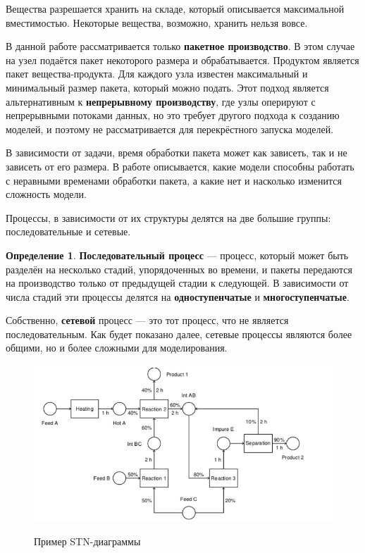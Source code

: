 \documentclass[12pt, twoside]{article}
\theoremstyle{definition}
\newtheorem{definition}[section]{Определение}
\begin{document}
Вещества разрешается хранить на складе, который описывается максимальной вместимостью. Некоторые вещества, возможно, хранить нельзя вовсе.

В данной работе рассматривается только \textbf{пакетное производство}. В этом случае на узел подаётся пакет некоторого размера и обрабатывается. Продуктом является пакет вещества-продукта. Для каждого узла известен максимальный и минимальный размер пакета, который можно подать. Этот подход является альтернативным к \textbf{непрерывному производству}, где узлы оперируют с непрерывными потоками данных, но это требует другого подхода к созданию моделей, и поэтому не рассматривается для перекрёстного запуска моделей.

В зависимости от задачи, время обработки пакета может как зависеть, так и не зависеть от его размера. В работе описывается, какие модели способны работать с неравными временами обработки пакета, а какие нет и насколько изменится сложность модели.

Процессы, в зависимости от их структуры делятся на две большие группы: последовательные и сетевые.

\begin{definition} \textbf{Последовательный процесс} --- процесс, который может быть разделён на несколько стадий, упорядоченных во времени, и пакеты передаются на производство только от предыдущей стадии к следующей. В зависимости от числа стадий эти процессы делятся на \textbf{одноступенчатые} и \textbf{многоступенчатые}.
\end{definition}

Собственно, \textbf{сетевой} процесс --- это тот процесс, что не является последовательным. Как будет показано далее, сетевые процессы являются более общими, но и более сложными для моделирования. 

\begin{figure}[h]
\caption{Пример STN-диаграммы}
\centering
\includegraphics[width=1.0\textwidth]{пример процесса}
\label{fig:stn_exmp}
\end{figure}
\end{document}
